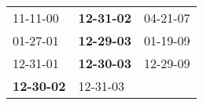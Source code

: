 \begin{supertabular}{p{0.33\columnwidth}p{0.33\columnwidth}p{0.33\columnwidth}}
          11-11-00\textsuperscript{} &  \textbf{12-31-02\textsuperscript{}} &  04-21-07\textsuperscript{} \\
          01-27-01\textsuperscript{} &  \textbf{12-29-03\textsuperscript{}} &  01-19-09\textsuperscript{} \\
          12-31-01\textsuperscript{} &  \textbf{12-30-03\textsuperscript{}} &  12-29-09\textsuperscript{} \\
 \textbf{12-30-02\textsuperscript{}} &           12-31-03\textsuperscript{} &                             \\
\end{supertabular}
